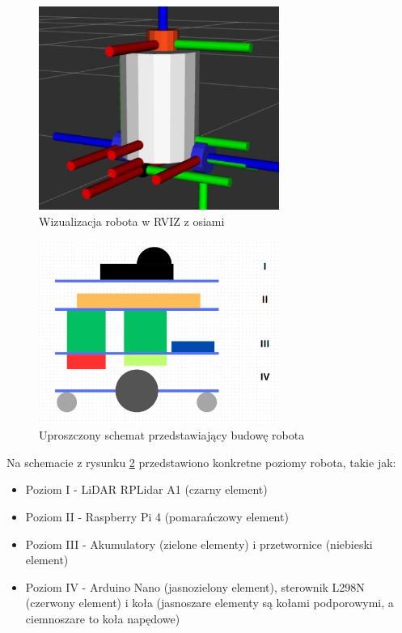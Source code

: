 \documentclass[a4paper,twoside,12pt]{book}
\begin{document}
		\begin{figure}[!hb]
			\centering
			\includegraphics[width=0.7\textwidth]{images/robot-rviz2.png}
			\caption{Wizualizacja robota w RVIZ z osiami}
			\label{fig:robot-rviz2}
			\end{figure}
	
			\newpage
	\begin{figure}[!hb]
		\centering
		\includegraphics[width=0.7\textwidth]{images/schemat-robot.png}
		\caption{Uproszczony schemat przedstawiający budowę robota}
		\label{fig:robot-schemat}
		\end{figure}
Na schemacie z rysunku \ref{fig:robot-schemat} przedstawiono konkretne poziomy robota, takie jak:
\begin{itemize}
	\item Poziom I - LiDAR RPLidar A1 (czarny element)
	\item Poziom II - Raspberry Pi 4 (pomarańczowy element)
	\item Poziom III - Akumulatory (zielone elementy) i przetwornice (niebieski element)
	\item Poziom IV - Arduino Nano (jasnozielony element), sterownik L298N (czerwony element) i koła (jasnoszare elementy są kołami podporowymi, a ciemnoszare to koła napędowe)
\end{itemize}
\newpage
\end{document}

